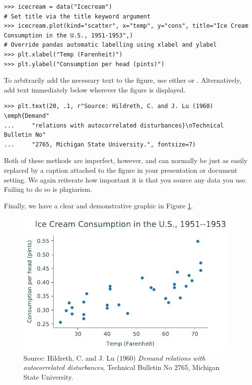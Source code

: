 \begin{lstlisting}
>>> icecream = data("Icecream")
# Set title via the title keyword argument
>>> icecream.plot(kind="scatter", x="temp", y="cons", title="Ice Cream Consumption in the U.S., 1951-1953",)
# Override pandas automatic labelling using xlabel and ylabel
>>> plt.xlabel("Temp (Farenheit)")
>>> plt.ylabel("Consumption per head (pints)")
\end{lstlisting}

To arbitrarily add the necessary text to the figure, use either  or .
Alternatively, add text immediately below wherever the figure is displayed.

\begin{lstlisting}
>>> plt.text(20, .1, r"Source: Hildreth, C. and J. Lu (1960) \emph{Demand"
...     "relations with autocorrelated disturbances}\nTechnical Bulletin No"
...     "2765, Michigan State University.", fontsize=7)
\end{lstlisting}

Both of these methods are imperfect, however, and can normally be just as easily replaced by a caption attached to the figure in your presentation or document setting.
We again reiterate how important it is that you source any data you use.
Failing to do so is plagiarism.

Finally, we have a clear and demonstrative graphic in Figure \ref{fig:labels}.

\begin{figure}[H]
    \centering
    \includegraphics[width=.7\textwidth]{figures/ice_cream_good.pdf}
    \caption{Source:  Hildreth, C. and J. Lu (1960) \emph{Demand relations with autocorrelated disturbances}, Technical Bulletin No 2765, Michigan State University.}
    \label{fig:labels}
\end{figure}

